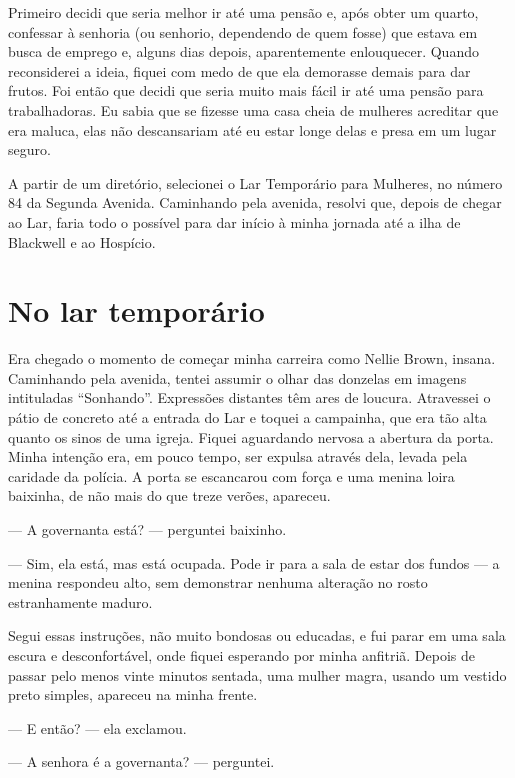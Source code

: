 Primeiro decidi que seria melhor ir até uma pensão e, após obter um
quarto, confessar à senhoria (ou senhorio, dependendo de quem fosse) que
estava em busca de emprego e, alguns dias depois, aparentemente
enlouquecer. Quando reconsiderei a ideia, fiquei com medo de que ela
demorasse demais para dar frutos. Foi então que decidi que seria muito
mais fácil ir até uma pensão para trabalhadoras. Eu sabia que se fizesse
uma casa cheia de mulheres acreditar que era maluca, elas não
descansariam até eu estar longe delas e presa em um lugar seguro.

A partir de um diretório, selecionei o Lar Temporário para Mulheres, no
número 84 da Segunda Avenida. Caminhando pela avenida, resolvi que,
depois de chegar ao Lar, faria todo o possível para dar início à minha
jornada até a ilha de Blackwell e ao Hospício.

\chapter{No lar
temporário}\label{capuxedtulo-iii-no-lar-temporuxe1rio}

Era chegado o momento de começar minha carreira como Nellie Brown,
insana. Caminhando pela avenida, tentei assumir o olhar das donzelas em
imagens intituladas ``Sonhando''. Expressões distantes têm ares de
loucura. Atravessei o pátio de concreto até a entrada do Lar e toquei a
campainha, que era tão alta quanto os sinos de uma igreja. Fiquei
aguardando nervosa a abertura da porta. Minha intenção era, em pouco
tempo, ser expulsa através dela, levada pela caridade da polícia. A
porta se escancarou com força e uma menina loira baixinha, de não mais
do que treze verões, apareceu.

--- A governanta está? --- perguntei baixinho.

--- Sim, ela está, mas está ocupada. Pode ir para a sala de estar dos
fundos --- a menina respondeu alto, sem demonstrar nenhuma alteração no
rosto estranhamente maduro.


Segui essas instruções, não muito bondosas ou educadas, e fui parar em uma
sala escura e desconfortável, onde fiquei esperando por minha anfitriã.
Depois de passar pelo menos vinte minutos sentada, uma mulher magra,
usando um vestido preto simples, apareceu na minha frente. 

--- E então? --- ela exclamou.

--- A senhora é a governanta? --- perguntei.

